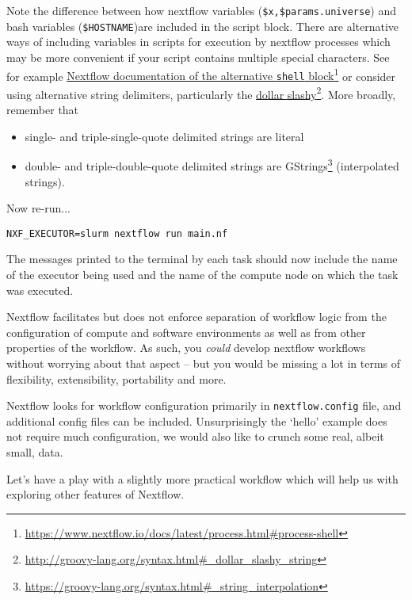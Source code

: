 \begin{warning}
Note the difference between how nextflow variables (\texttt{\$x,\$params.universe}) and bash variables (\texttt{\$HOSTNAME})are included in the script block.
There are alternative ways of including variables in scripts for execution by nextflow processes which may be more convenient if your script contains multiple special characters. See for example \href{https://www.nextflow.io/docs/latest/process.html#process-shell}{Nextflow documentation of the alternative \texttt{shell} block}\footnote{\url{https://www.nextflow.io/docs/latest/process.html\#process-shell}
} or consider using alternative string delimiters, particularly the \href{http://groovy-lang.org/syntax.html#_dollar_slashy_string}{dollar slashy}\footnote{\url{http://groovy-lang.org/syntax.html\#_dollar\_slashy\_string}}.
More broadly, remember that 
\begin{itemize}
\item single- and triple-single-quote delimited strings are literal
\item double- and triple-double-quote delimited strings are GStrings\footnote{\url{https://groovy-lang.org/syntax.html\#\_string\_interpolation}} (interpolated strings).
\end{itemize} 
\end{warning}

\begin{steps}

Now re-run... 
\begin{lstlisting}
NXF_EXECUTOR=slurm nextflow run main.nf
\end{lstlisting}
\end{steps}

The messages printed to the terminal by each task should now include the name of the executor being used and the name of the compute node on which the task was executed.\\


\begin{note}
Nextflow facilitates but does not enforce separation of workflow logic from the configuration
of compute and software environments as well as from other properties of the workflow.  
As such, you \textit{could} develop nextflow workflows without worrying about that 
aspect -- but you would be missing a lot in terms of flexibility, extensibility, portability and more.

Nextflow looks for workflow configuration primarily in \texttt{nextflow.config} file, and additional config files can be included. Unsurprisingly the `hello' example does not require much configuration,
we would also like to crunch some real, albeit small, data.

Let's have a play with a slightly more practical workflow which will help us with exploring other features of Nextflow.
\end{note}


